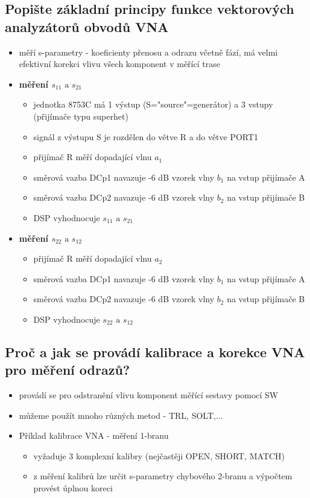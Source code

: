 \documentclass[a4paper,czech]{article}
\begin{document}
\subsection{\textbf{Popište základní principy funkce vektorových analyzátorů obvodů VNA}}
\begin{itemize}
	\item měří s-parametry - koeficienty přenosu a odrazu včetně fází, má velmi efektivní korekci vlivu všech komponent v měřící trase
	\item \textbf{měření $s_{11} \text{ a } s_{21}$}
	\begin{itemize}
		\item jednotka 8753C má 1 výstup (S="source"=generátor) a 3 vstupy (přijímače typu superhet)
		\item signál z výstupu S je rozdělen do větve R a do větve PORT1
		\item přijímač R měří dopadající vlnu $a_1$
		\item směrová vazba DCp1 navazuje -6 dB vzorek vlny $b_1$ na vstup přijímače A
		\item směrová vazba DCp2 navazuje -6 dB vzorek vlny $b_2$ na vstup přijímače B
		\item DSP vyhodnocuje $s_{11} \text{ a } s_{21}$
	\end{itemize}
	\item \textbf{měření $s_{22} \text{ a } s_{12}$}
	\begin{itemize}
		\item přijímač R měří dopadající vlnu $a_2$
		\item směrová vazba DCp1 navazuje -6 dB vzorek vlny $b_1$ na vstup přijímače A
		\item směrová vazba DCp2 navazuje -6 dB vzorek vlny $b_2$ na vstup přijímače B
		\item DSP vyhodnocuje $s_{22} \text{ a } s_{12}$
	\end{itemize}
\end{itemize}
\subsection{\textbf{Proč a jak se provádí kalibrace a korekce VNA pro měření odrazů?}}
\begin{itemize}
	\item provádí se pro odstranění vlivu komponent měřící sestavy pomocí SW
	\item můžeme použít mnoho různých metod - TRL, SOLT,...
	\item Příklad kalibrace VNA - měření 1-branu
	\begin{itemize}
		\item vyžaduje 3 komplexní kalibry (nejčastěji OPEN, SHORT, MATCH)
		\item z měření kalibrů lze určit s-parametry chybového 2-branu a výpočtem provést úplnou koreci
	\end{itemize}
\end{itemize}
\end{document}
